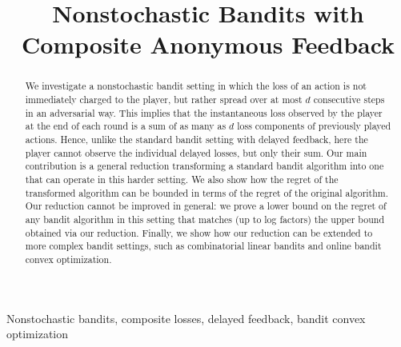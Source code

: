\documentclass[final,12pt]{colt2018}%
\title[Composite Anonymous Feedback]{Nonstochastic Bandits with Composite Anonymous Feedback}
\begin{document}
\maketitle

\begin{abstract}
We investigate a nonstochastic bandit setting in which the loss of an action is not immediately charged to the player, but rather spread over at most $d$ consecutive steps in an adversarial way. This implies that the instantaneous loss observed by the player at the end of each round is a sum of as many as $d$ loss components of previously played actions. Hence, unlike the standard bandit setting with delayed feedback, here the player cannot observe the individual delayed losses, but only their sum. Our main contribution is a general reduction transforming a standard bandit algorithm into one that can operate in this harder setting. We also show how the regret of the transformed algorithm can be bounded in terms of the regret of the original algorithm. Our reduction cannot be improved in general: we prove a lower bound on the regret of any bandit algorithm in this setting that matches (up to log factors) the upper bound obtained via our reduction. Finally, we show how our reduction can be extended to more complex bandit settings, such as combinatorial linear bandits and online bandit convex optimization.
\end{abstract}

\begin{keywords}
Nonstochastic bandits, composite losses, delayed feedback, bandit convex optimization
\end{keywords}





%







%

%


%


\newpage




\appendix
%

\end{document}
